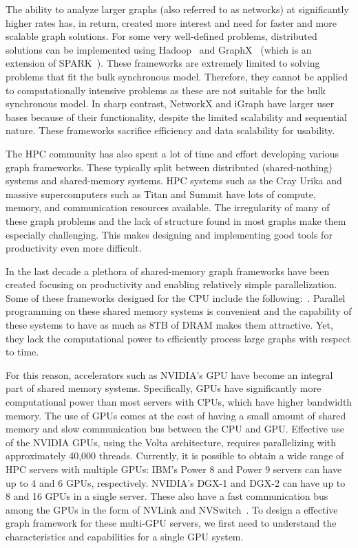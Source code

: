 The ability to analyze larger graphs (also referred to as networks) at significantly higher rates has, in return, created more interest and need for faster and more scalable graph solutions. For some very well-defined problems, distributed solutions can be implemented using Hadoop~\cite{White:2009:HDG:1717298} and GraphX~\cite{gonzalez2014graphx} (which is an extension of SPARK~\cite{zaharia2010spark}). These frameworks are extremely limited to solving problems that fit the bulk synchronous model. Therefore, they cannot be applied to computationally intensive problems as these are not suitable for the bulk synchronous model. In sharp contrast, NetworkX\cite{SciPyProceedings_11} and iGraph\cite{Han:2010:IFC:1920841.1920901} have larger user bases because of their functionality, despite the limited scalability and sequential nature. These frameworks sacrifice efficiency and data scalability for usability.

The HPC community has also spent a lot of time and effort developing various graph frameworks. These typically split between distributed (shared-nothing) systems and shared-memory systems. HPC systems such as the Cray Urika and massive supercomputers such as Titan and Summit have lots of compute, memory, and communication resources available. The irregularity of many of these graph problems and the lack of structure found in most graphs make them especially challenging. This makes designing and implementing good tools for productivity even more difficult.

In the last decade a plethora of shared-memory graph frameworks have been created focusing on productivity and enabling relatively simple parallelization. Some of these frameworks designed for the CPU include the following:~\cite{stinger-tr,shun2013ligra,beamer2015gap,pingali2011tao,Sundaram:2015:GHP:2809974.2809983}.
Parallel programming on these shared memory systems is convenient and the capability of these systems to have as much as 8TB of DRAM makes them attractive. Yet, they lack the computational power to efficiently process large graphs with respect to time.

For this reason, accelerators such as NVIDIA's GPU have become an integral part of shared memory systems. Specifically, GPUs have significantly more computational power than most servers with CPUs, which have higher bandwidth memory. The use of GPUs comes at the cost of having a small amount of shared memory and slow communication bus between the CPU and GPU\@. Effective use of the NVIDIA GPUs, using the Volta architecture, requires parallelizing with approximately 40,000 threads.
Currently, it is possible to obtain a wide range of HPC servers with multiple GPUs: IBM's Power 8 and Power 9 servers can have up to 4 and 6 GPUs, respectively. NVIDIA's DGX-1 and DGX-2 can have up to 8 and 16 GPUs in a single server. These also have a fast communication bus among the GPUs in the form of NVLink and NVSwitch~\cite{foley2017ultra}.
To design a effective graph framework for these multi-GPU servers, we first need to understand the characteristics and capabilities for a single GPU system.

